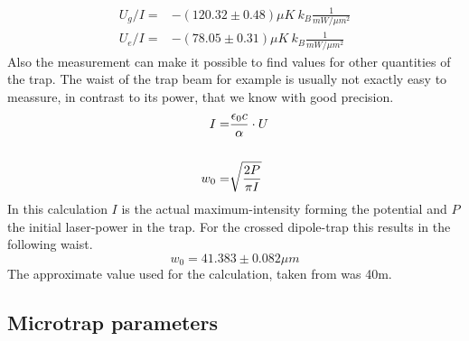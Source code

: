 \begin{align}
U_g/I=&-(120.32\pm 0.48)\unit{\mu K\ k_B\frac{1}{mW/\mu m^2}}\\
U_e/I=&-(78.05\pm 0.31)\unit{\mu K\ k_B\frac{1}{mW/\mu m^2}}
\end{align}
Also the measurement can make it possible to find values for other quantities of the trap. The waist of the trap beam for example is usually not exactly easy to meassure, in contrast to its power, that we know with good precision.
\begin{align}
I=&\frac{\epsilon_0 c}{\alpha}\cdot U\\\notag\\
w_0=&\sqrt{\frac{2P}{\pi I}}
\end{align}
In this calculation $I$ is the actual maximum-intensity forming the potential and $P$ the initial laser-power in the trap. For the crossed dipole-trap this results in the following waist.
\begin{equation}
w_0=41.383\pm 0.082\unit{\mu m}
\end{equation}
The approximate value used for the calculation, taken from \cite{lompe} was 40\mu m.

\subsection{Microtrap parameters}



